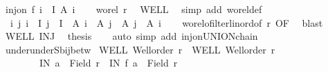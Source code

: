 \begin{isabellebody}
\ {\isachardoublequoteopen}inj{\isacharunderscore}{\kern0pt}on\ f\ {\isacharparenleft}{\kern0pt}{\isasymUnion}i\ {\isasymin}\ I{\isachardot}{\kern0pt}\ A\ i{\isacharparenright}{\kern0pt}{\isachardoublequoteclose}\isanewline
%
\isadelimproof
%
\endisadelimproof
%
\isatagproof
{}\isamarkupfalse%
{\isacharminus}{\kern0pt}\isanewline
\ \ \isamarkupfalse%
\ {\isachardoublequoteopen}wo{\isacharunderscore}{\kern0pt}rel\ r{\isachardoublequoteclose}\ \isamarkupfalse%
\ WELL\ \isamarkupfalse%
\ {\isacharparenleft}{\kern0pt}simp\ add{\isacharcolon}{\kern0pt}\ wo{\isacharunderscore}{\kern0pt}rel{\isacharunderscore}{\kern0pt}def{\isacharparenright}{\kern0pt}\isanewline
\ \ \isamarkupfalse%
\ {\isachardoublequoteopen}{\isasymAnd}\ i\ j{\isachardot}{\kern0pt}\ {\isasymlbrakk}i\ {\isasymin}\ I{\isacharsemicolon}{\kern0pt}\ j\ {\isasymin}\ I{\isasymrbrakk}\ {\isasymLongrightarrow}\ A\ i\ {\isacharless}{\kern0pt}{\isacharequal}{\kern0pt}\ A\ j\ {\isasymor}\ A\ j\ {\isacharless}{\kern0pt}{\isacharequal}{\kern0pt}\ A\ i{\isachardoublequoteclose}\isanewline
\ \ \isamarkupfalse%
\ wo{\isacharunderscore}{\kern0pt}rel{\isachardot}{\kern0pt}ofilter{\isacharunderscore}{\kern0pt}linord{\isacharbrackleft}{\kern0pt}of\ r{\isacharbrackright}{\kern0pt}\ OF\ \isamarkupfalse%
\ blast\isanewline
\ \ \isamarkupfalse%
\ WELL\ INJ\ \isamarkupfalse%
\ {\isacharquery}{\kern0pt}thesis\isanewline
\ \ \isamarkupfalse%
\ {\isacharparenleft}{\kern0pt}auto\ simp\ add{\isacharcolon}{\kern0pt}\ inj{\isacharunderscore}{\kern0pt}on{\isacharunderscore}{\kern0pt}UNION{\isacharunderscore}{\kern0pt}chain{\isacharparenright}{\kern0pt}\isanewline
{}\isamarkupfalse%
%
\endisatagproof
{\isafoldproof}%
%
\isadelimproof
\isanewline
%
\endisadelimproof
\isanewline
{}\isamarkupfalse%
\ under{\isacharunderscore}{\kern0pt}underS{\isacharunderscore}{\kern0pt}bij{\isacharunderscore}{\kern0pt}betw{\isacharcolon}{\kern0pt}\isanewline
{}\ WELL{\isacharcolon}{\kern0pt}\ {\isachardoublequoteopen}Well{\isacharunderscore}{\kern0pt}order\ r{\isachardoublequoteclose}\ \ WELL{\isacharprime}{\kern0pt}{\isacharcolon}{\kern0pt}\ {\isachardoublequoteopen}Well{\isacharunderscore}{\kern0pt}order\ r{\isacharprime}{\kern0pt}{\isachardoublequoteclose}\ \isanewline
\ \ \ \ \ \ \ \ IN{\isacharcolon}{\kern0pt}\ {\isachardoublequoteopen}a\ {\isasymin}\ Field\ r{\isachardoublequoteclose}\ \ IN{\isacharprime}{\kern0pt}{\isacharcolon}{\kern0pt}\ {\isachardoublequoteopen}f\ a\ {\isasymin}\ Field\ r{\isacharprime}{\kern0pt}{\isachardoublequoteclose}\ \isanewline

\end{isabellebody}
